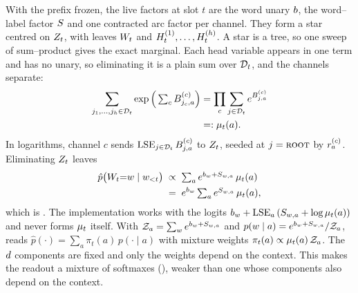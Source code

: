 With the prefix frozen, the live factors at slot $t$ are the word unary $b$, the word--label
factor $S$ and one contracted arc factor per channel. They form a star centred on $Z_{t}$,
with leaves $W_{t}$ and $H_{t}^{(1)},\dots,H_{t}^{(h)}$. A star is a tree, so one sweep of
sum--product gives the exact marginal. Each head variable appears in one term and has no unary,
so eliminating it is a plain sum over $\mathcal{D}_{t}$, and the channels separate:
%
\begin{equation}
\label{eq:elim-H}
\begin{aligned}
  \sum_{j_1,\dots,j_h \in \mathcal{D}_{t}}
    \exp\Big(\textstyle\sum_c B^{(c)}_{j_c,a}\Big)
  &= \prod_c \sum_{j\in\mathcal{D}_{t}} e^{B^{(c)}_{j,a}}\\
  &=: \mu_{t}(a).
\end{aligned}
\end{equation}
%
In logarithms, channel $c$ sends $\operatorname*{LSE}_{j\in\mathcal{D}_{t}} B^{(c)}_{j,a}$ to $Z_{t}$, seeded at
$j = \textsc{root}$ by $r^{(c)}_a$. Eliminating $Z_{t}$ leaves
%
\begin{equation}
\label{eq:elim-Z}
\begin{aligned}
  \hat{p}\big(W_{t}{=}w \mid w_{{<}t}\big)
    &\;\propto\; \textstyle\sum_a e^{b_w + S_{w,a}}\,\mu_{t}(a)\\
    &\;=\; e^{b_w} \textstyle\sum_a e^{S_{w,a}}\,\mu_{t}(a),
\end{aligned}
\end{equation}
%
which is . The implementation works with the logits
$b_w + \operatorname*{LSE}_a\,(S_{w,a} + \log\mu_{t}(a))$ and never forms $\mu_{t}$ itself.
With $\mathcal{Z}_a = \sum_{w} e^{b_{w} + S_{w,a}}$ and
$p(w \mid a) = e^{b_w + S_{w,a}}/\mathcal{Z}_a$,  reads
$\hat p(\cdot) = \sum_a \pi_t(a)\, p(\cdot \mid a)$ with mixture weights
$\pi_t(a) \propto \mu_{t}(a)\,\mathcal{Z}_a$. The $d$ components are fixed and only the
weights depend on the context. This makes the readout a mixture of softmaxes
(), weaker than one whose components also depend on the context.

